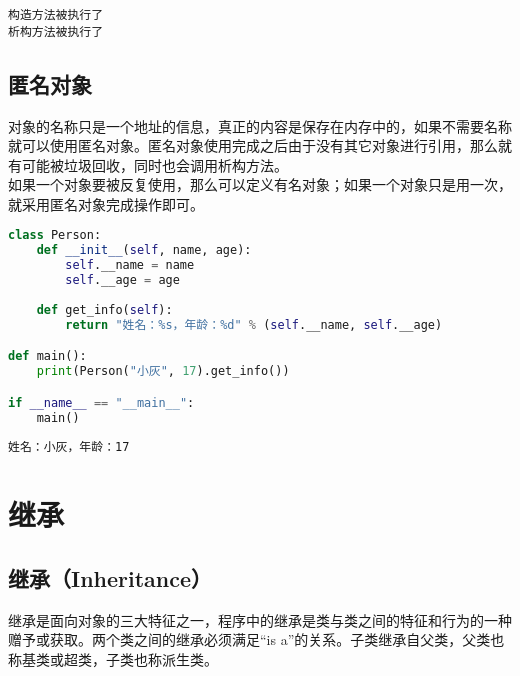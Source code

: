 \begin{tcolorbox}
	\begin{verbatim}
构造方法被执行了
析构方法被执行了
\end{verbatim}
\end{tcolorbox}

\vspace{0.5cm}

\subsection{匿名对象}

对象的名称只是一个地址的信息，真正的内容是保存在内存中的，如果不需要名称就可以使用匿名对象。匿名对象使用完成之后由于没有其它对象进行引用，那么就有可能被垃圾回收，同时也会调用析构方法。\\

如果一个对象要被反复使用，那么可以定义有名对象；如果一个对象只是用一次，就采用匿名对象完成操作即可。\\


\begin{lstlisting}[language=Python]
class Person:
    def __init__(self, name, age):
        self.__name = name
        self.__age = age
    
    def get_info(self):
        return "姓名：%s，年龄：%d" % (self.__name, self.__age)

def main():
    print(Person("小灰", 17).get_info())

if __name__ == "__main__":
    main()
\end{lstlisting}

\begin{tcolorbox}
	\begin{verbatim}
姓名：小灰，年龄：17
\end{verbatim}
\end{tcolorbox}

\newpage

\section{继承}

\subsection{继承（Inheritance）}

继承是面向对象的三大特征之一，程序中的继承是类与类之间的特征和行为的一种赠予或获取。两个类之间的继承必须满足“is a”的关系。子类继承自父类，父类也称基类或超类，子类也称派生类。

